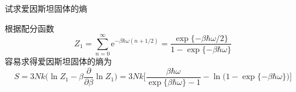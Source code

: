 \begin{problem}[7.20]
试求爱因斯坦固体的熵
\end{problem}
\begin{solution}
根据配分函数
\[
Z_1 = \sum_{n=0}^\infty \mathrm{e}^{-\beta\hbar\omega(n+1/2)} = \frac{\exp\{-\beta\hbar\omega/2\}}{1-\exp\{-\beta\hbar\omega\}}
\]
容易求得爱因斯坦固体的熵为
\[
S = 3Nk\bigg(\ln Z_1 -\beta \frac{\partial}{\partial\beta}\ln Z_1\bigg) 
= 3Nk\bigg[\frac{\beta\hbar\omega}{\exp\{\beta\hbar\omega\}-1}-\ln\Big(1-\exp\{-\beta\hbar\omega\}\Big)\bigg]
\]
\end{solution}
